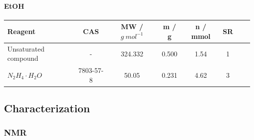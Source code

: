 \documentclass[../Master.tex]{subfiles}
\begin{document}


\paragraph{EtOH}

\begin{center}
	\begin{tabular}[b]{lccccccc}
		\toprule
		Reagent               & CAS       & MW / \(g \ mol^{-1}\) & m / g & n / mmol & SR \\
		\midrule
		Unsaturated compound  & -         & 324.332               & 0.500 & 1.54     & 1  \\
		\(N_2H_4 \cdot H_2O\) & 7803-57-8 & 50.05                 & 0.231 & 4.62     & 3  \\
		\bottomrule
	\end{tabular}
\end{center}



\subsection{Characterization}
\subsubsection{NMR}
\end{document}
